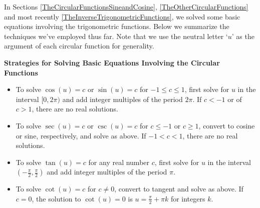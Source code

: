 \documentclass{ximera}
\begin{document}
	\author{Stitz-Zeager}




\setcounter{footnote}{0}

\label{TrigonometricEquationsandInequalities}

In Sections \ref{TheCircularFunctionsSineandCosine}, \ref{TheOtherCircularFunctions} and most recently \ref{TheInverseTrigonometricFunctions}, we solved some basic equations involving the trigonometric functions. Below we summarize the techniques we've employed thus far.  Note that we use the neutral letter `$u$' as the argument of each circular function for generality.

\smallskip

\label{trigeqnstrategy1}

\centerline{\textbf{Strategies for Solving Basic Equations Involving the Circular Functions}}

\smallskip

\begin{itemize}

\item To solve $\cos(u) = c$ or $\sin(u) = c$ for $-1 \leq c \leq 1$, first solve for $u$ in the interval $[0,2\pi)$ and add integer multiples of the period $2\pi$.  If $c < -1$ or of $c > 1$, there are no real solutions.

\item To solve $\sec(u) = c$ or $\csc(u) = c$ for $c \leq -1$ or $c \geq 1$,  convert to cosine or sine, respectively, and solve as above.  If $-1 < c < 1$, there are no real solutions.

\item To solve  $\tan(u) = c$ for any real number $c$,  first solve for $u$ in the interval $\left(-\frac{\pi}{2}, \frac{\pi}{2}\right)$ and add integer multiples of the period $\pi$.

\item  To solve  $\cot(u) = c$ for $c \neq 0$, convert to tangent and solve as above.  If $c = 0$, the solution to $\cot(u) = 0$ is $u = \frac{\pi}{2} + \pi k$ for integers $k$.

\end{itemize}

\smallskip


\smallskip
\end{document}
